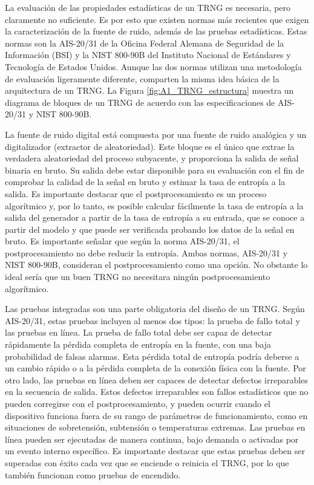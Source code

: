             La evaluación de las propiedades estadísticas de un TRNG es necesaria, pero claramente no suficiente. Es por esto que existen normas más recientes que exigen la caracterización de la fuente de ruido, además de las pruebas estadísticas. Estas normas son la AIS-20/31 \cite{AIS2011} de la Oficina Federal Alemana de Seguridad de la Información (BSI) y la NIST 800-90B \cite{Turan2018} del Instituto Nacional de Estándares y Tecnología de Estados Unidos. Aunque las dos normas utilizan una metodología de evaluación ligeramente diferente, comparten la misma idea básica de la arquitectura de un TRNG. La Figura \ref{fig:A1_TRNG_estructura} muestra un diagrama de bloques de un TRNG de acuerdo con las especificaciones de AIS-20/31 y NIST 800-90B.

            La fuente de ruido digital está compuesta por una fuente de ruido analógica y un digitalizador (extractor de aleatoriedad). Este bloque es el único que extrae la verdadera aleatoriedad del proceso subyacente, y proporciona la salida de señal binaria en bruto. Su salida debe estar disponible para su evaluación con el fin de comprobar la calidad de la señal en bruto y estimar la tasa de entropía a la salida. Es importante destacar que el postprocesamiento es un proceso algorítmico y, por lo tanto, es posible calcular fácilmente la tasa de entropía a la salida del generador a partir de la tasa de entropía a su entrada, que se conoce a partir del modelo y que puede ser verificada probando los datos de la señal en bruto. Es importante señalar que según la norma AIS-20/31, el postprocesamiento no debe reducir la entropía. Ambas normas, AIS-20/31 y NIST 800-90B, consideran el postprocesamiento como una opción. No obstante lo ideal sería que un buen TRNG no necesitara ningún postprocesamiento algorítmico.

            Las pruebas integradas son una parte obligatoria del diseño de un TRNG. Según AIS-20/31, estas pruebas incluyen al menos dos tipos: la prueba de fallo total y las pruebas en línea. La prueba de fallo total debe ser capaz de detectar rápidamente la pérdida completa de entropía en la fuente, con una baja probabilidad de falsas alarmas. Esta pérdida total de entropía podría deberse a un cambio rápido o a la pérdida completa de la conexión física con la fuente. Por otro lado, las pruebas en línea deben ser capaces de detectar defectos irreparables en la secuencia de salida. Estos defectos irreparables son fallos estadísticos que no pueden corregirse con el postprocesamiento, y pueden ocurrir cuando el dispositivo funciona fuera de su rango de parámetros de funcionamiento, como en situaciones de sobretensión, subtensión o temperaturas extremas. Las pruebas en línea pueden ser ejecutadas de manera continua, bajo demanda o activadas por un evento interno específico. Es importante destacar que estas pruebas deben ser superadas con éxito cada vez que se enciende o reinicia el TRNG, por lo que también funcionan como pruebas de encendido. \cite{Petura2019}

